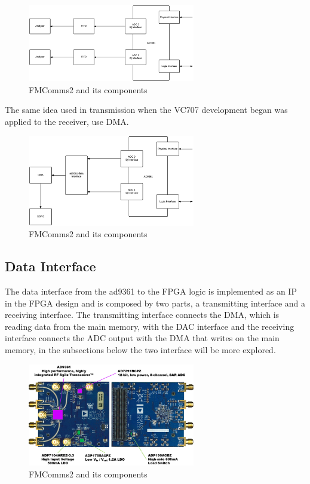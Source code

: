 \begin{figure}[htbp]
    \centering
    \includegraphics[width=0.65\textwidth]{./figures/adc_fifo}
    \caption{ FMComms2 and its components
    \label{fig:fmcomm}}
\end{figure}

The same idea used in transmission when the VC707 development began was applied
to the receiver, use DMA.

\begin{figure}[htbp]
    \centering
    \includegraphics[width=0.65\textwidth]{./figures/adc_dma}
    \caption{ FMComms2 and its components
    \label{fig:fmcomm}}
\end{figure}


\subsection{Data Interface}

The data interface from the ad9361 to the FPGA logic is implemented as an IP in
the FPGA design and is composed by two parts, a transmitting interface and a
receiving interface. The transmitting interface connects the DMA, which is
reading data from the main memory, with the DAC interface and the receiving
interface connects the ADC output with the DMA that writes on the main memory,
in the subsections below the two interface will be more explored.

\begin{figure}[htbp]
    \centering
    \includegraphics[width=0.65\textwidth]{./figures/fmcomms2_pic}
    \caption{ FMComms2 and its components
    \label{fig:fmcomm}}
\end{figure}


